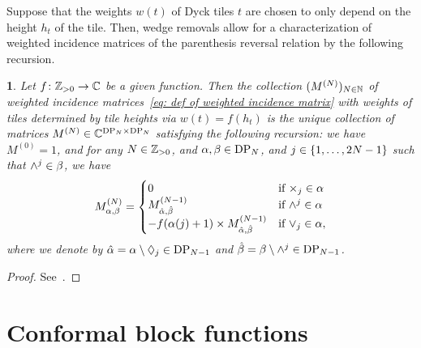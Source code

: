 \documentclass[oneside,english]{amsart}
\numberwithin{equation}{section}
\numberwithin{figure}{section}
\theoremstyle{plain}
\theoremstyle{plain}
\theoremstyle{plain}
\theoremstyle{remark}
\theoremstyle{plain}
\newtheorem{prop}[lem]{\protect\propositionname}
\theoremstyle{plain}
\theoremstyle{plain}
\theoremstyle{plain}
\theoremstyle{plain}
\theoremstyle{plain}
\theoremstyle{plain}
\theoremstyle{plain}
\providecommand{\propositionname}{Proposition}
\newcommand{\blue}[1]{{\color{blue} #1}}
\begin{document}
Suppose that the weights $w(t)$ of Dyck tiles $t$ are chosen to only depend on
the height $h_t$ of the tile. %
Then, wedge removals %
allow for a characterization of weighted incidence matrices %
of the parenthesis reversal relation by the following recursion.
\begin{prop}\label{prop: recursion for matrix elements}
Let $f \colon \mathbb{Z}_{> 0} \to \mathbb{C}$ be a given function. Then
the collection $(M^{(N)})_{N \in \mathbb{N}}$ of weighted incidence
matrices~\eqref{eq: def of weighted incidence matrix} %
with weights of tiles determined by tile heights via $w(t) = f(h_t)$
is the unique collection of matrices $M^{(N)} \in \mathbb{C}^{\mathrm{DP}_N \times \mathrm{DP}_N}$
satisfying the following recursion: we have $M^{(0)} = 1$,
and for any $N \in \mathbb{Z}_{> 0}$, and $\alpha, \beta \in \mathrm{DP}_N$, and $j \in \left\{ 1,\ldots,2N-1\right\}$ such that 
$\wedge^j \in \beta$, we have
\begin{align*} %
M_{\walk,\beta}^{(N)} = \begin{cases} 
0 & \text{if } \slopeat{j} \in \walk \\
M_{\hat{\walk},\hat{\beta}}^{(N-1)}
& \text{if } \upwedgeat{j} \in \walk \\
- f(\walk(j)+1) \times
M_{\hat{\walk},\hat{\beta}}^{(N-1)} 
& \text{if } \downwedgeat{j} \in \walk,
\end{cases} 
\end{align*}
where we denote by $\hat{\alpha} = \alpha \setminus \lozenge_j \in \mathrm{DP}_{N-1}$ and 
$\hat{\beta} = \beta \setminus \wedge^j \in \mathrm{DP}_{N-1}$.
\end{prop}
\begin{proof}
See~\cite[Lemmas~2.13~and~2.14]{KKP-boundary_correlations_in_planar_LERW_and_UST}.
\end{proof}

\bigskip

\section{Conformal block functions}
\label{sec: conformal block functions background}

\end{document}
